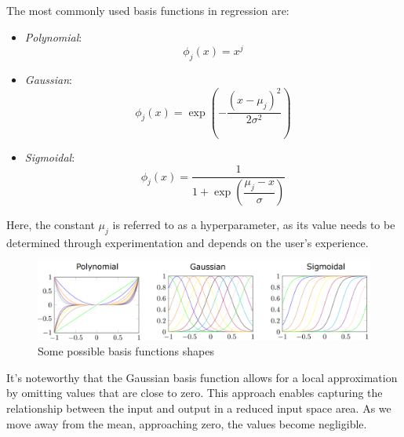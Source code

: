 The most commonly used basis functions in regression are:
\begin{itemize}
    \item \textit{Polynomial}: 
        \[\phi_j(x)=x^j\]
    \item \textit{Gaussian}:
        \[\phi_j(x)=\exp \left( -\dfrac{{\left( x-\mu_j \right)}^2}{2 \sigma^2} \right) \]
    \item \textit{Sigmoidal}: 
        \[\phi_j(x)=\dfrac{1}{1+\exp\left(\dfrac{\mu_j-x}{\sigma}\right)}\]
\end{itemize}
Here, the constant $\mu_j$ is referred to as a hyperparameter, as its value needs to be determined through experimentation and depends on the user's experience.

\begin{figure}[H]
    \centering
    \includegraphics[width=0.75\linewidth]{images/basis.png}
    \caption{Some possible basis functions shapes}
\end{figure}

It's noteworthy that the Gaussian basis function allows for a local approximation by omitting values that are close to zero.
This approach enables capturing the relationship between the input and output in a reduced input space area.
As we move away from the mean, approaching zero, the values become negligible.

